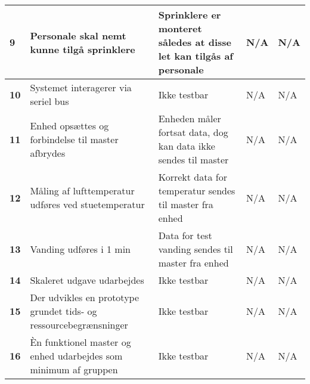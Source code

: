 \begin{center}
\begin{longtable}{|p{}|p{}|p{}|p{}|p{}|}
\textbf{9}	&Personale skal nemt kunne tilgå sprinklere
			&Sprinklere er monteret således at disse let kan tilgås af personale
			&N/A
			&N/A \\ \hline 
			
\textbf{10}	&Systemet interagerer via seriel bus
			&Ikke testbar
			&N/A
			&N/A \\ \hline 
			
			
\textbf{11}	&Enhed opsættes og forbindelse til master afbrydes
			&Enheden måler fortsat data, dog kan data ikke sendes til master
			&N/A
			&N/A \\ \hline 
			
\textbf{12}	&Måling af lufttemperatur udføres ved stuetemperatur
			&Korrekt data for temperatur sendes til master fra enhed
			&N/A
			&N/A \\ \hline 
			
\textbf{13}	&Vanding udføres i 1 min 
			&Data for test vanding sendes til master fra enhed
			&N/A
			&N/A \\ \hline 
			
			
\textbf{14}	&Skaleret udgave udarbejdes
			&Ikke testbar
			&N/A
			&N/A \\ \hline 
			
\textbf{15}	&Der udvikles en prototype grundet tids- og ressourcebegrænsninger
			&Ikke testbar
			&N/A
			&N/A \\ \hline 
			
\textbf{16}	&Èn funktionel master og enhed udarbejdes som minimum af gruppen
			&Ikke testbar
			&N/A
			&N/A \\ \hline 
			
\end{longtable}
	\label{ATIFKrav} 
\end{center}


